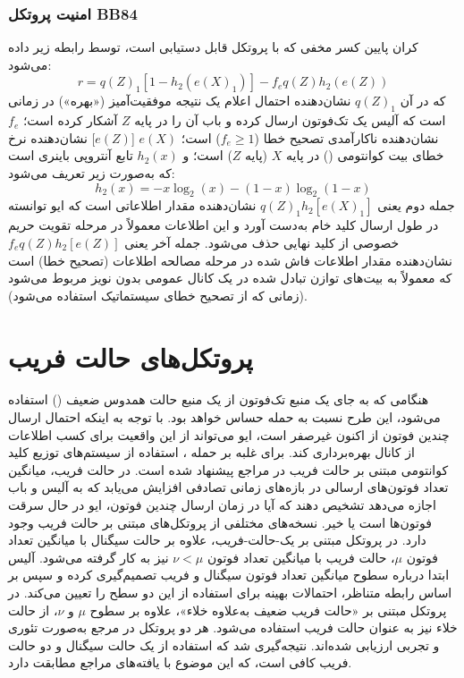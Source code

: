 \subsubsection{امنیت پروتکل BB84}
\label{subsec:6-5-4}
کران پایین کسر مخفی که با پروتکل  قابل دستیابی است، توسط رابطه زیر داده می‌شود:
\begin{equation}
	r = q(Z)_1 [1 - h_2(e(X)_1)] - f_e q(Z) h_2(e(Z))
	\label{eq:6-32}
\end{equation}
که در آن $q(Z)_1$ نشان‌دهنده احتمال اعلام یک نتیجه موفقیت‌آمیز («بهره») در زمانی است که آلیس یک تک‌فوتون ارسال کرده و باب آن را در پایه $Z$ آشکار کرده است؛ $f_e$ نشان‌دهنده ناکارآمدی تصحیح خطا ($f_e \geq 1$) است؛ $e(X)$ [$e(Z)$] نشان‌دهنده نرخ خطای بیت کوانتومی () در پایه $X$ (پایه $Z$) است؛ و $h_2(x)$ تابع آنتروپی باینری است که به‌صورت زیر تعریف می‌شود:
\begin{equation}
	h_2(x) = -x \log_2(x) - (1-x) \log_2(1-x)
	\label{eq:6-33}
\end{equation}
جمله دوم یعنی $q(Z)_1 h_2[e(X)_1]$ نشان‌دهنده مقدار اطلاعاتی است که ایو توانسته در طول ارسال کلید خام به‌دست آورد و این اطلاعات معمولاً در مرحله تقویت حریم خصوصی از کلید نهایی حذف می‌شود. جمله آخر یعنی $f_e q(Z) h_2[e(Z)]$ نشان‌دهنده مقدار اطلاعات فاش شده در مرحله مصالحه اطلاعات (تصحیح خطا) است که معمولاً به بیت‌های توازن تبادل شده در یک کانال عمومی بدون نویز مربوط می‌شود (زمانی که از تصحیح خطای سیستماتیک استفاده می‌شود).

\section{پروتکل‌های حالت فریب}
\label{sec:6-6}
هنگامی که به جای یک منبع تک‌فوتون از یک منبع حالت همدوس ضعیف () استفاده می‌شود، این طرح نسبت به حمله  حساس خواهد بود. با توجه به اینکه احتمال ارسال چندین فوتون از  اکنون غیرصفر است، ایو می‌تواند از این واقعیت برای کسب اطلاعات از کانال بهره‌برداری کند. برای غلبه بر حمله ، استفاده از سیستم‌های توزیع کلید کوانتومی مبتنی بر حالت فریب در مراجع \cite{37, 61, 62, 63, 64, 65, 66, 67, 68, 69, 70} پیشنهاد شده است. در  حالت فریب، میانگین تعداد فوتون‌های ارسالی در بازه‌های زمانی تصادفی افزایش می‌یابد که به آلیس و باب اجازه می‌دهد تشخیص دهند که آیا در زمان ارسال چندین فوتون، ایو در حال سرقت فوتون‌ها است یا خیر. نسخه‌های مختلفی از پروتکل‌های مبتنی بر حالت فریب وجود دارد. در پروتکل مبتنی بر یک-حالت-فریب، علاوه بر حالت سیگنال با میانگین تعداد فوتون $\mu$، حالت فریب با میانگین تعداد فوتون $\nu < \mu$ نیز به کار گرفته می‌شود. آلیس ابتدا درباره سطوح میانگین تعداد فوتون سیگنال و فریب تصمیم‌گیری کرده و سپس بر اساس رابطه  متناظر، احتمالات بهینه برای استفاده از این دو سطح را تعیین می‌کند. در پروتکل مبتنی بر «حالت فریب ضعیف به‌علاوه خلاء»، علاوه بر سطوح $\mu$ و $\nu$، از حالت خلاء نیز به عنوان حالت فریب استفاده می‌شود. هر دو پروتکل در مرجع \cite{67} به‌صورت تئوری و تجربی ارزیابی شده‌اند. نتیجه‌گیری شد که استفاده از یک حالت سیگنال و دو حالت فریب کافی است، که این موضوع با یافته‌های مراجع \cite{68, 69} مطابقت دارد.

